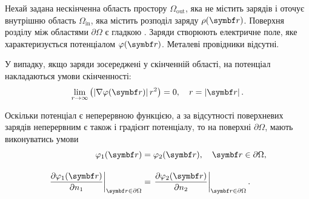 \documentclass[]{ProblemBook}
\begin{document}
Нехай задана нескінченна область простору $\Omega_\text{out}$, яка не містить зарядів і оточує внутрішню область $\Omega_\text{in}$, яка містить розподіл заряду $\rho(\vect{r})$. Поверхня розділу між областями $\partial\Omega$ є гладкою . Заряди створюють електричне поле, яке характеризується потенціалом $\pot(\vect{r})$. Металеві провідники відсутні. 

% 

У випадку, якщо заряди зосереджені у скінченній області, на потенціал накладаються умови скінченності:
\begin{equation}\label{eq:Efinity}
	\lim\limits_{r \to \infty } \left( {\left| {\nabla \pot({\vect{r}})} \right|{r^2}} \right) = 0,\quad r = \left| {\vect{r}} \right|.
\end{equation}

Оскільки потенціал є неперервною функцією, а за відсутності поверхневих зарядів неперервним є також і градієнт потенціалу, то на поверхні $\partial\Omega$, мають виконуватись умови 
\begin{equation}\label{eq:BC}
    \begin{aligned}
        \pot_1(\vect{r}) &=  \pot_2(\vect{r}), \quad \vect{r} \in \partial\Omega, \\[1em]
        \left.\frac{\partial\pot_1(\vect{r})}{\partial n_1}\right|_{\vect{r} \in \partial\Omega} &= 
    \left.\frac{\partial\pot_2(\vect{r})}{\partial n_2}\right|_{\vect{r} \in \partial\Omega}. 
    \end{aligned}  
\end{equation}
\end{document}
